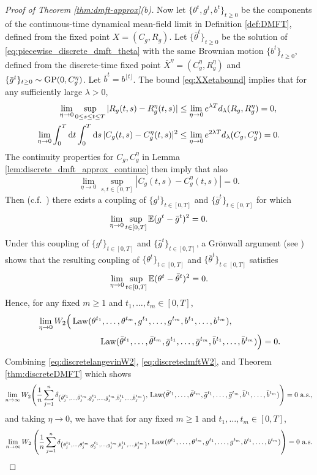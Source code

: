 \begin{proof}[Proof of Theorem \ref{thm:dmft-approx}(b)]
Now let $\{\theta^t,g^t,b^t\}_{t \geq 0}$ be the components of the
continuous-time dynamical mean-field limit in Definition
\ref{def:DMFT}, defined from the fixed point $X=(C_g,R_g)$.
Let $\{\bar\theta^t\}_{t \geq 0}$ be the solution of
\eqref{eq:piecewise_discrete_dmft_theta} with the same Brownian motion
$\{b^t\}_{t \geq 0}$, defined from the discrete-time fixed
point $\bar X^\eta=(C_g^\eta,R_g^\eta)$ and $\{\bar g^t\}_{t \geq 0} \sim
\operatorname{GP}(0,C_g^\eta)$. Let $\bar b^t=b^{\lfloor t \rfloor}$. The bound
\eqref{eq:XXetabound} implies that for any sufficiently large $\lambda>0$,
\begin{align*}
\lim_{\eta \to 0} \sup_{0\leq s \leq t \leq T} |R_g(t,s)-R_g^\eta(t,s)|
&\leq \lim_{\eta \to 0} e^{\lambda T}d_\lambda(R_g,R_g^\eta)=0,\\
\lim_{\eta \to 0} \int_0^T \mathrm{d} t \int_0^T \mathrm{d} s\,|C_g(t,s)-C_g^\eta(t,s)|^2
&\leq \lim_{\eta \to 0} e^{2\lambda T}d_\lambda(C_g,C_g^\eta)=0.
\end{align*}
The continuity properties for $C_g,C_g^\eta$ in Lemma
\ref{lem:discrete_dmft_approx_continue} then imply that also
\[\lim_{\eta \to 0} \sup_{s,t \in [0,T]} |C_g(t,s)-C_g^\eta(t,s)|=0.\]
Then (c.f.\ \cite[Lemma~D.1]{fan2025dynamicalII}) there exists a coupling of
$\{g^t\}_{t \in [0,T]}$ and $\{\bar g^t\}_{t \in [0,T]}$ for which
\[\lim_{\eta \to 0} \sup_{t \in [0,T]} \mathbb{E}(g^t-\bar g^t)^2=0.\]
Under this coupling of $\{g^t\}_{t \in [0,T]}$ and $\{\bar g^t\}_{t \in [0,T]}$,
a Gr\"onwall argument (see \cite[Eq.\ (100)]{fan2025dynamicalI})
shows that the resulting coupling
of $\{\theta^t\}_{t \in [0,T]}$ and $\{\bar \theta^t\}_{t \in [0,T]}$ satisfies
\[\lim_{\eta \to 0} \sup_{t \in [0,T]} \mathbb{E}(\theta^t-\bar\theta^t)^2=0.\]
Hence, for any fixed $m \geq 1$ and $t_1,\ldots,t_m \in [0,T]$,
\begin{align}
&\lim_{\eta \to 0} W_2\Big(
\operatorname{Law}(\theta^{t_1},\ldots,
\theta^{t_m}, g^{t_1},\ldots,
g^{t_m}, b^{t_1},\ldots, b^{t_m}),\notag\\
&\hspace{1in}\operatorname{Law}(\bar\theta^{t_1},\ldots,
\bar\theta^{t_m},\bar g^{t_1},\ldots,
\bar g^{t_m}, \bar b^{t_1},\ldots,\bar b^{t_m})\Big)=0.\label{eq:discretedmftW2}
\end{align}
Combining \eqref{eq:discretelangevinW2}, \eqref{eq:discretedmftW2}, and Theorem
\ref{thm:discreteDMFT} which shows
\[\lim_{n \to \infty} W_2\Bigg(\frac{1}{n}\sum_{j=1}^n
\delta_{\left(\bar\theta^{t_1}_j, \ldots,
\bar\theta_j^{t_m},\bar g^{t_1}_j, \ldots,
\bar g_j^{t_m},\bar b^{t_1}_{j}, \ldots,
\bar b_{j}^{t_m}\right)},\,\operatorname{Law}(\bar\theta^{t_1},\ldots,
\bar\theta^{t_m},\bar g^{t_1},\ldots,
\bar g^{t_m}, \bar b^{t_1},\ldots,\bar b^{t_m})\Bigg)=0 \text{ a.s.},\]
and taking $\eta \to 0$, we have that for any fixed $m \geq 1$
and $t_1,\ldots,t_m \in [0,T]$,
\begin{align}\label{eq:pointwise-W2-convergence}
\lim_{n \to \infty}
W_2\left(\frac{1}{n}\sum_{j=1}^n \delta_{\left(\theta^{t_1}_j, \ldots,
\theta^{t_m}_j,g^{t_1}_j, \ldots, g^{t_m}_j,b^{t_1}_j, \ldots,
b^{t_m}_j\right)},\,\operatorname{Law}(\theta^{t_1},\ldots,
\theta^{t_m}, g^{t_1},\ldots,g^{t_m}, b^{t_1},\ldots,b^{t_m})\right)=0
\text{ a.s.}
\end{align}


\end{proof}
